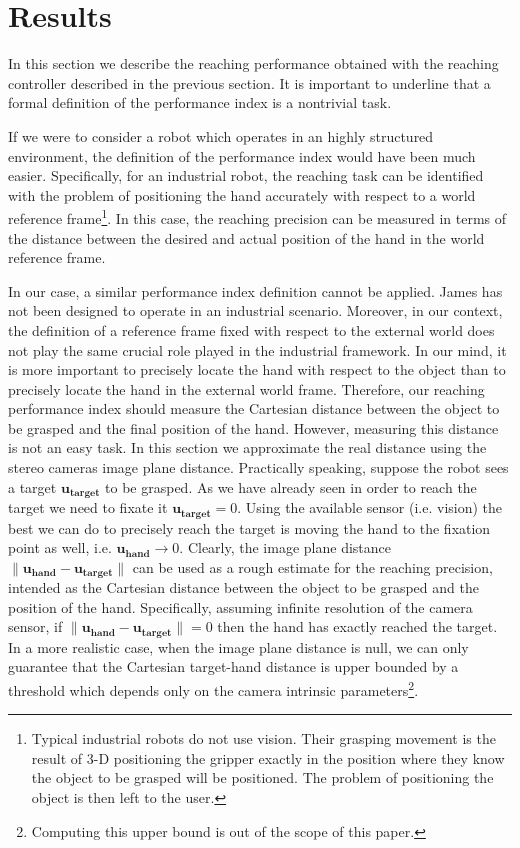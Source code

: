 \section{Results}
\label{sec:results}

In this section we describe the reaching performance obtained with 
the reaching controller described in the previous section. It is
important to underline that a formal definition of the performance 
index is a nontrivial task. 

If we were to consider a robot which operates in an highly structured
environment, the definition of the performance index would have been much easier. 
Specifically, for an industrial robot, the reaching task can be identified 
with the problem of positioning the hand accurately with respect to a world 
reference frame\footnote{Typical industrial robots do not use vision. Their 
grasping movement is the result of 3-D positioning the gripper exactly in the 
position where they know the object to be grasped will be positioned. The problem
of positioning the object is then left to the user.}. In this case, the reaching 
precision can be measured in terms of the distance between the desired and 
actual position of the hand in the world reference frame.
 
In our case, a similar performance index definition cannot be applied. James has not 
been designed to operate in an industrial scenario. Moreover, in our context, the definition of a reference 
frame fixed with respect to the external world does not play the same crucial 
role played in the industrial framework. In our mind, it is more important to 
precisely locate the hand with respect to the object than to precisely locate 
the hand in the external world frame. Therefore, our reaching performance index 
should measure the Cartesian distance between the object to be grasped and the final 
position of the hand. However, measuring this distance is not an easy task. In this section
we approximate the real distance using the stereo cameras image plane distance. Practically speaking, suppose the 
robot sees a target $\mathbf {u_{target}}$ to be grasped. As we have already seen in order to reach the 
target we need to fixate it $\mathbf {u_{target}} = 0$. Using the available sensor (i.e. vision) the best we can do to precisely reach the target is moving the hand to the fixation point as well, i.e. $\mathbf 
{u_{hand}} \longrightarrow 0$. Clearly, the image plane distance $\| \mathbf {u_{hand}} - \mathbf 
{u_{target}}\|$ can be used as a rough estimate for the reaching precision, intended as  the
Cartesian distance between the object to be grasped and the position of the hand. Specifically,
assuming infinite resolution of the camera sensor, if $\| \mathbf {u_{hand}} - \mathbf 
{u_{target}}\| = 0$ then the hand has exactly reached the target. In a more realistic case,
when the image plane distance is null, we can only guarantee that the Cartesian target-hand distance
is upper bounded by a threshold which depends only on the camera intrinsic parameters\footnote{
Computing this upper bound is out of the scope of this paper.}. 

